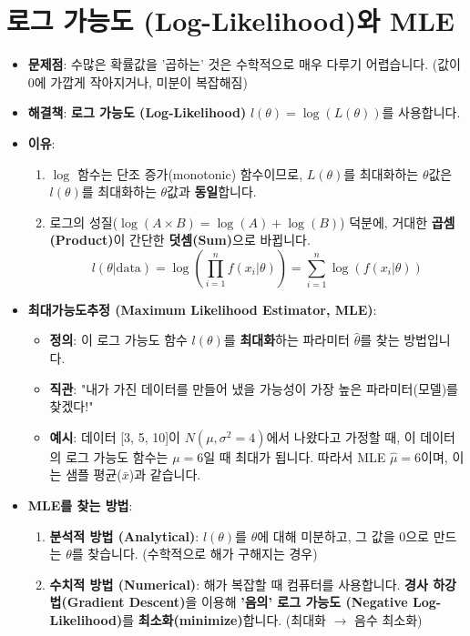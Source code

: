 \documentclass[11pt,a4paper]{book}
\theoremstyle{definition}
\begin{document}
\section{로그 가능도 (Log-Likelihood)와 MLE}

\begin{itemize}
    \item \textbf{문제점}: 수많은 확률값을 '곱하는' 것은 수학적으로 매우 다루기 어렵습니다. (값이 0에 가깝게 작아지거나, 미분이 복잡해짐)
    \item \textbf{해결책}: \textbf{로그 가능도 (Log-Likelihood)} $l(\theta) = \log(L(\theta))$를 사용합니다.
    \item \textbf{이유}:
        \begin{enumerate}
            \item $\log$ 함수는 단조 증가(monotonic) 함수이므로, $L(\theta)$를 최대화하는 $\theta$값은 $l(\theta)$를 최대화하는 $\theta$값과 \textbf{동일}합니다.
            \item 로그의 성질($\log(A \times B) = \log(A) + \log(B)$) 덕분에, 거대한 \textbf{곱셈(Product)}이 간단한 \textbf{덧셈(Sum)}으로 바뀝니다.
            $$l(\theta | \text{data}) = \log \left( \prod_{i=1}^{n} f(x_i | \theta) \right) = \sum_{i=1}^{n} \log(f(x_i | \theta))$$
        \end{enumerate}
    \item \textbf{최대가능도추정 (Maximum Likelihood Estimator, MLE)}:
        \begin{itemize}
            \item \textbf{정의}: 이 로그 가능도 함수 $l(\theta)$를 \textbf{최대화}하는 파라미터 $\hat{\theta}$를 찾는 방법입니다.
            \item \textbf{직관}: "내가 가진 데이터를 만들어 냈을 가능성이 가장 높은 파라미터(모델)를 찾겠다!"
            \item \textbf{예시}: 데이터 [3, 5, 10]이 $N(\mu, \sigma^2=4)$에서 나왔다고 가정할 때, 이 데이터의 로그 가능도 함수는 $\mu=6$일 때 최대가 됩니다. 따라서 MLE $\hat{\mu} = 6$이며, 이는 샘플 평균($\bar{x}$)과 같습니다.
        \end{itemize}
    \item \textbf{MLE를 찾는 방법}:
        \begin{enumerate}
            \item \textbf{분석적 방법 (Analytical)}: $l(\theta)$를 $\theta$에 대해 미분하고, 그 값을 0으로 만드는 $\theta$를 찾습니다. (수학적으로 해가 구해지는 경우)
            \item \textbf{수치적 방법 (Numerical)}: 해가 복잡할 때 컴퓨터를 사용합니다. \textbf{경사 하강법(Gradient Descent)}을 이용해 \textbf{'음의' 로그 가능도 (Negative Log-Likelihood)}를 \textbf{최소화(minimize)}합니다. (최대화 $\to$ 음수 최소화)
        \end{enumerate}
\end{itemize}
\end{document}
